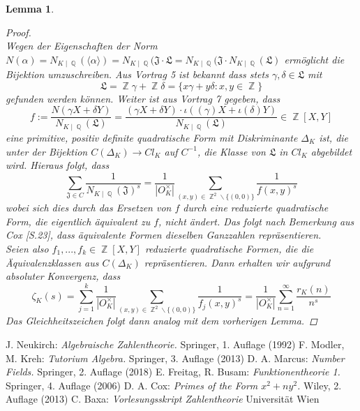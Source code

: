 \documentclass[10pt,a4paper]{article}
\theoremstyle{plain}
\newtheorem{lem}[thm]{Lemma}
\theoremstyle{definition}
\theoremstyle{remark}
\DeclareMathOperator{\Q}{\mathbb{Q}}
\DeclareMathOperator{\Z}{\mathbb{Z}}
\begin{document}
\begin{lem}
\begin{proof}
\\
Wegen der Eigenschaften der Norm $N(\alpha)= N_{K\mid \Q}(\langle \alpha \rangle)=N_{K\mid \Q}(\mathfrak{J\cdot L}=N_{K\mid \Q}(\mathfrak{J}\cdot N_{K\mid \Q}(\mathfrak{L})$ ermöglicht die Bijektion umzuschreiben. Aus Vortrag 5 ist bekannt dass stets $\gamma, \delta \in \mathfrak{L}$ mit $$\mathfrak{L}= \Z\gamma+\Z\delta = \{x\gamma+y\delta\colon x,y \in \Z\}$$ gefunden werden können. Weiter ist aus Vortrag 7 gegeben, dass $$f:=\frac{N(\gamma X+\delta Y)}{N_{K\mid \Q}(\mathfrak{L})}=\frac{(\gamma X + \delta Y)\cdot \iota((\gamma)X+\iota(\delta)Y)}{N_{K\mid \Q}(\mathfrak{L})} \in \Z[X,Y]$$eine primitive, positiv definite quadratische Form mit Diskriminante $\Delta_K$ ist, die unter der Bijektion $C(\Delta_K)\rightarrow Cl_K$ auf $C^{-1}$, die Klasse von $\mathfrak{L}$ in $Cl_K$ abgebildet wird. Hieraus folgt, dass $$\sum_{\mathfrak{J}\in C}\frac{1}{N_{K\mid \Q }(\mathfrak{J})^s}=\frac{1}{|O_K^{\times}|}\sum_{(x,y)\in \Z^2\backslash \{ (0,0)\}}\frac{1}{f(x,y)^s}$$wobei sich dies durch das Ersetzen von $f$ durch eine reduzierte quadratische Form, die eigentlich äquivalent zu $f$, nicht ändert. Das folgt nach Bemerkung aus Cox \cite{Cox}[S.23], dass äquivalente Formen dieselben Ganzzahlen repräsentieren.
\\
Seien also $f_1,...,f_k \in \Z[X,Y]$ reduzierte quadratische Formen, die die Äquivalenzklassen aus $C(\Delta_K)$ repräsentieren. Dann erhalten wir aufgrund absoluter Konvergenz, dass $$\zeta_K(s) = \sum_{j=1}^{k}\frac{1}{|O_K^{\times}|}\sum_{(x,y) \in \Z^2 \backslash \{(0,0)\}}\frac{1}{f_j(x,y)^s}=\frac{1}{|O_K^{\times}|}\sum_{n=1}^{\infty}\frac{r_K(n)}{n^s}$$
Das Gleichheitszeichen folgt dann analog mit dem vorherigen Lemma.
\end{proof}
\end{lem}
 
\begin{thebibliography}{99}
 J. Neukirch: \textit{Algebraische Zahlentheorie.} Springer, 1. Auflage (1992)
 F. Modler, M. Kreh: \textit{Tutorium Algebra.} Springer, 3. Auflage (2013)
 D. A. Marcus: \textit{Number Fields.} Springer, 2. Auflage (2018)
 E. Freitag, R. Busam: \textit{Funktionentheorie 1.} Springer, 4. Auflage (2006)
 D. A. Cox: \textit{Primes of the Form ${x}^2 + n{y}^2$.} Wiley, 2. Auflage (2013)
 C. Baxa: \textit{Vorlesungsskript Zahlentheorie} Universität Wien
\end{thebibliography}
\end{document}
